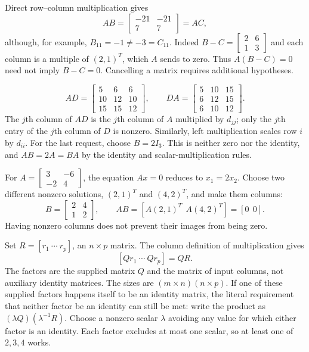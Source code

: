 Direct row--column multiplication gives
\[
 AB=\begin{bmatrix}-21&-21\\7&7\end{bmatrix}
 =AC,
\]
although, for example, $B_{11}=-1\ne-3=C_{11}$.
Indeed $B-C=\begin{bmatrix}2&6\\1&3\end{bmatrix}$ and each column is a
multiple of $(2,1)^T$, which $A$ sends to zero. Thus $A(B-C)=0$ need
not imply $B-C=0$. Cancelling a matrix requires additional hypotheses.

\[
 AD=\begin{bmatrix}5&6&6\\10&12&10\\15&15&12\end{bmatrix},\qquad
 DA=\begin{bmatrix}5&10&15\\6&12&15\\6&10&12\end{bmatrix}.
\]
The $j$th column of $AD$ is the $j$th column of $A$ multiplied by $d_{jj}$;
only the $j$th entry of the $j$th column of $D$ is nonzero. Similarly,
left multiplication scales row $i$ by $d_{ii}$. For the last request,
choose $B=2I_3$. This is neither zero nor the identity, and
$AB=2A=BA$ by the identity and scalar-multiplication rules.

For $A=\begin{bmatrix}3&-6\\-2&4\end{bmatrix}$, the equation $Ax=0$
reduces to $x_1=2x_2$. Choose two different nonzero solutions,
$(2,1)^T$ and $(4,2)^T$, and make them columns:
\[
 B=\begin{bmatrix}2&4\\1&2\end{bmatrix},\qquad
 AB=[A(2,1)^T\ \ A(4,2)^T]=[0\ \ 0].
\]
Having nonzero columns does not prevent their images from being zero.

Set $R=[r_1\ \cdots\ r_p]$, an $n\times p$ matrix. The column
definition of multiplication gives
\[
 [Qr_1\ \cdots\ Qr_p]=QR.
\]
The factors are the supplied matrix $Q$ and the matrix of input columns,
not auxiliary identity matrices. The sizes are $(m\times n)(n\times p)$.
If one of these supplied factors happens itself to be an identity matrix,
the literal requirement that neither factor be an identity can still be met:
write the product as $(\lambda Q)(\lambda^{-1}R)$. Choose a nonzero
scalar $\lambda$ avoiding any value for which either factor is an identity.
Each factor excludes at most one scalar, so at least one of $2,3,4$ works.

